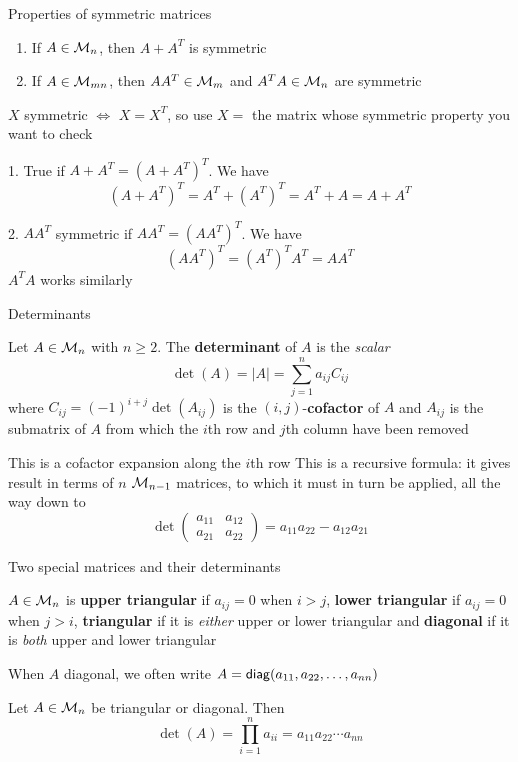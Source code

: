 \documentclass[aspectratio=169]{beamer}
\begin{document}
\begin{frame}{Properties of symmetric matrices}
\begin{theorem}
\begin{enumerate}
	\item If $A\in\mathcal{M}_n$, then $A+A^T$ is symmetric
	\item If $A\in\mathcal{M}_{mn}$, then $AA^T\in\mathcal{M}_m$ and $A^TA\in\mathcal{M}_n$ are symmetric
\end{enumerate}
\end{theorem}
\vfill
$X$ symmetric $\iff$ $X=X^T$, so use $X=$ the matrix whose symmetric property you want to check

1. True if $A+A^T=(A+A^T)^T$. We have 
\[
(A+A^T)^T=A^T+(A^T)^T=A^T+A=A+A^T
\]

2. $AA^T$ symmetric if $AA^T=(AA^T)^T$. We have 
\[
(AA^T)^T=(A^T)^TA^T=AA^T
\]
$A^TA$ works similarly
\end{frame}

\begin{frame}{Determinants}
\begin{definition}[Determinant]
Let $A\in\mathcal{M}_n$ with $n\geq 2$. The \textbf{determinant} of $A$ is the \emph{scalar}
\[
\det(A)=|A|=\sum_{j=1}^na_{ij}C_{ij}
\]
where $C_{ij}=(-1)^{i+j}\det(A_{ij})$ is the $(i,j)$-\textbf{cofactor} of $A$ and $A_{ij}$ is the submatrix of $A$ from which the $i$th row and $j$th column have been removed
\end{definition}
This is a cofactor expansion along the $i$th row
\vfill
This is a recursive formula: it gives result in terms of $n$ $\mathcal{M}_{n-1}$ matrices, to which it must in turn be applied, all the way down to
\[
\det\left(
\begin{matrix}
a_{11} & a_{12} \\ a_{21} & a_{22}
\end{matrix}\right) = a_{11}a_{22}-a_{12}a_{21}
\]
\end{frame}

\begin{frame}{Two special matrices and their determinants}
\begin{definition}
$A\in\mathcal{M}_n$ is \textbf{upper triangular} if $a_{ij}=0$ when $i>j$, \textbf{lower triangular} if $a_{ij}=0$ when $j>i$, \textbf{triangular} if it is \emph{either} upper or lower triangular and \textbf{diagonal} if it is \emph{both} upper and lower triangular
\end{definition}
When $A$ diagonal, we often write $A=\mathsf{diag}(a_{11},a_{22},\ldots,a_{nn})$
\begin{importanttheorem}
Let $A\in\mathcal{M}_n$ be triangular or diagonal. Then
\[
\det(A)=\prod_{i=1}^n a_{ii}=a_{11}a_{22}\cdots a_{nn}
\]
\end{importanttheorem}
\end{frame}
\end{document}
